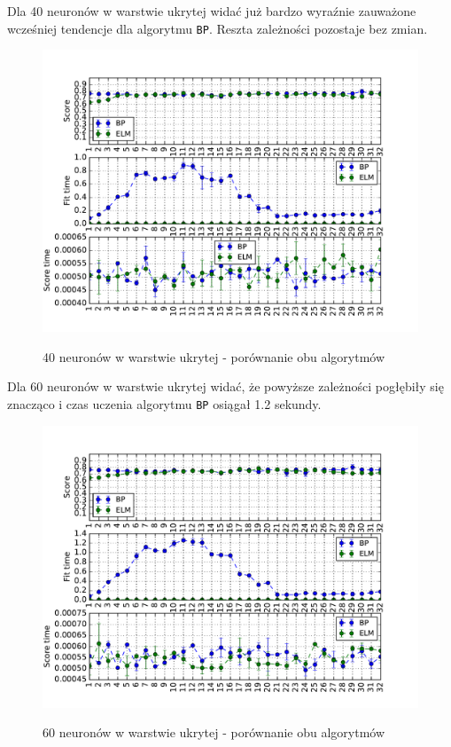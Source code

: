\newpage

Dla 40 neuronów w warstwie ukrytej widać już bardzo wyraźnie zauważone wcześniej tendencje dla algorytmu \texttt{BP}. Reszta zależności pozostaje bez zmian.

\begin{figure}[h!]
	\centering
	\includegraphics[width=1.0\linewidth]{img/bp_elm_40.pdf}
	\label{Rysunek}
	\caption{40 neuronów w warstwie ukrytej - porównanie obu algorytmów}
\end{figure}

\newpage

Dla 60 neuronów w warstwie ukrytej widać, że powyższe zależności pogłębiły się znacząco i czas uczenia algorytmu \texttt{BP} osiągał 1.2 sekundy. 

\begin{figure}[h!]
	\centering
	\includegraphics[width=1.0\linewidth]{img/bp_elm_60.pdf}
	\label{Rysunek}
	\caption{60 neuronów w warstwie ukrytej - porównanie obu algorytmów}
\end{figure}

